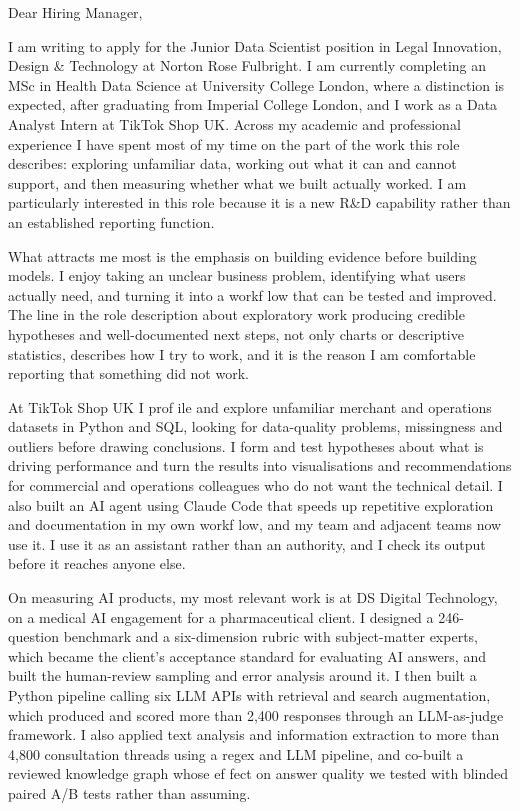 \documentclass[letterpaper,11pt]{article}
\begin{document}
Dear Hiring Manager,

I am writing to apply for the Junior Data Scientist position in Legal Innovation, Design \& Technology at Norton Rose Fulbright. I am currently completing an MSc in Health Data Science at University College London, where a distinction is expected, after graduating from Imperial College London, and I work as a Data Analyst Intern at TikTok Shop UK. Across my academic and professional experience I have spent most of my time on the part of the work this role describes: exploring unfamiliar data, working out what it can and cannot support, and then measuring whether what we built actually worked. I am particularly interested in this role because it is a new R\&D capability rather than an established reporting function.

What attracts me most is the emphasis on building evidence before building models. I enjoy taking an unclear business problem, identifying what users actually need, and turning it into a workf\kern0pt low that can be tested and improved. The line in the role description about exploratory work producing credible hypotheses and well-documented next steps, not only charts or descriptive statistics, describes how I try to work, and it is the reason I am comfortable reporting that something did not work.

At TikTok Shop UK I prof\kern0pt ile and explore unfamiliar merchant and operations datasets in Python and SQL, looking for data-quality problems, missingness and outliers before drawing conclusions. I form and test hypotheses about what is driving performance and turn the results into visualisations and recommendations for commercial and operations colleagues who do not want the technical detail. I also built an AI agent using Claude Code that speeds up repetitive exploration and documentation in my own workf\kern0pt low, and my team and adjacent teams now use it. I use it as an assistant rather than an authority, and I check its output before it reaches anyone else.

On measuring AI products, my most relevant work is at DS Digital Technology, on a medical AI engagement for a pharmaceutical client. I designed a 246-question benchmark and a six-dimension rubric with subject-matter experts, which became the client's acceptance standard for evaluating AI answers, and built the human-review sampling and error analysis around it. I then built a Python pipeline calling six LLM APIs with retrieval and search augmentation, which produced and scored more than 2,400 responses through an LLM-as-judge framework. I also applied text analysis and information extraction to more than 4,800 consultation threads using a regex and LLM pipeline, and co-built a reviewed knowledge graph whose ef\kern0pt fect on answer quality we tested with blinded paired A/B tests rather than assuming.
\end{document}
